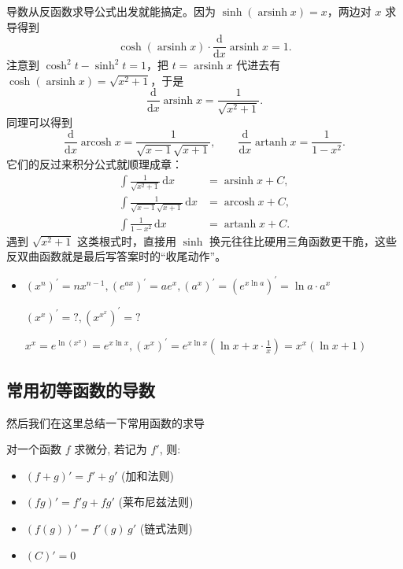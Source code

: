 \documentclass[lang=cn,newtx,10pt,scheme=chinese]{elegantbook}
\DeclareMathOperator{\arsinh}{arsinh}
\DeclareMathOperator{\arcosh}{arcosh}
\DeclareMathOperator{\artanh}{artanh}
\begin{document}
\begin{example}
  导数从反函数求导公式出发就能搞定。因为 $\sinh(\arsinh x)=x$，两边对 $x$ 求导得到
  \begin{equation*}
    \cosh(\arsinh x) \cdot \frac{\mathrm{d}}{\mathrm{d}x}\arsinh x = 1.
  \end{equation*}
  注意到 $\cosh^{2} t - \sinh^{2} t = 1$，把 $t=\arsinh x$ 代进去有 $\cosh(\arsinh x)=\sqrt{x^{2}+1}$，于是
  \begin{equation*}
    \frac{\mathrm{d}}{\mathrm{d}x}\arsinh x = \frac{1}{\sqrt{x^{2}+1}}.
  \end{equation*}
  同理可以得到
  \begin{equation*}
    \frac{\mathrm{d}}{\mathrm{d}x}\arcosh x = \frac{1}{\sqrt{x-1}\sqrt{x+1}}, \qquad
    \frac{\mathrm{d}}{\mathrm{d}x}\artanh x = \frac{1}{1-x^{2}}.
  \end{equation*}
  它们的反过来积分公式就顺理成章：
  \begin{align}
    \int \frac{1}{\sqrt{x^{2}+1}}\,\mathrm{d}x &= \arsinh x + C, \\
    \int \frac{1}{\sqrt{x-1}\sqrt{x+1}}\,\mathrm{d}x &= \arcosh x + C, \\
    \int \frac{1}{1-x^{2}}\,\mathrm{d}x &= \artanh x + C.
  \end{align}
  遇到 $\sqrt{x^{2}+1}$ 这类根式时，直接用 $\sinh$ 换元往往比硬用三角函数更干脆，这些反双曲函数就是最后写答案时的“收尾动作”。
\end{example}

\begin{itemize}
  \item $(x^{n})^{\prime }=n x^{n-1},(e^{ax})^{\prime }=ae^{x},(a^{x})^{\prime }=(e^{x\ln a})^{\prime }=\ln a \cdot  a^{x}$
  \begin{problem}
    $(x^{x})^{\prime }=?,(x^{x^{x}})^{\prime }=?$
  \end{problem}
  \begin{solution}
    $x^{x}=e^{\ln(x^{x})}=e^{x\ln x},(x^{x})^{\prime }=e^{x \ln x}(\ln x+x\cdot \frac{1}{x})=x^{x}(\ln x+1)$
  \end{solution}
\end{itemize}

\subsection{常用初等函数的导数}
然后我们在这里总结一下常用函数的求导

\begin{proposition}[微分的四条法则]
  对一个函数 $f$ 求微分, 若记为 $f'$, 则:
  \begin{itemize}
    \item $(f + g)' = f' + g'$ (加和法则)
    \item $(fg)' = f'g + fg'$ (莱布尼兹法则)
    \item $(f(g))' = f'(g)\, g'$ (链式法则)
    \item $(C)' = 0$
  \end{itemize}
\end{proposition}
\end{document}
